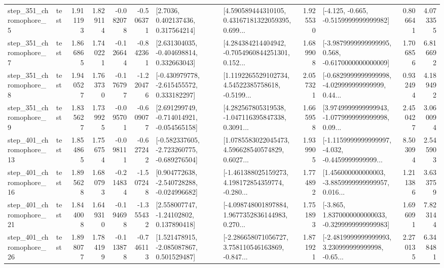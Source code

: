 \begin{tabular}{llrrrrllrlrr}
   step\_351\_chromophore\_5 &      test &      1.911193 &    1.829114 &     -0.082078 & -0.506371 &          [2.7036, 0.402137436, 0.317564214] &  [4.590589444310105, 0.43167181322059395, 0.699... &       1.925530 &              [-4.125, -0.665, -0.5159999999999982] &            0.806641 &          4.073355 \\
   step\_351\_chromophore\_7 &      test &      1.866865 &    1.740221 &     -0.126644 & -0.842361 &    [2.631304035, -0.404698814, 0.332663043] &  [4.284384214404942, -0.7054960844251301, 0.152... &       1.689908 &  [-3.9879999999999995, 0.568, -0.6170000000000009] &            1.706856 &          6.816692 \\
   step\_351\_chromophore\_8 &      test &      1.940527 &    1.763730 &     -0.176797 & -1.220476 &   [-0.430979778, -2.615455572, 0.333182297] &  [1.1192265529102734, 4.54522385758618, -0.5199... &       2.057321 &  [-0.6829999999999998, -4.029999999999999, 0.44... &            0.932494 &          4.189492 \\
   step\_351\_chromophore\_9 &      test &      1.835627 &    1.739925 &     -0.095701 & -0.609077 &   [2.691299749, -0.714014921, -0.054565158] &  [4.282567805319538, -1.047116395847338, 0.3091... &       1.665958 &  [3.9749999999999943, -1.0779999999999998, 0.09... &            2.450427 &          3.060094 \\
  step\_401\_chromophore\_13 &      test &      1.854865 &    1.756754 &     -0.098111 & -0.627242 &  [-0.582337605, -2.723260775, -0.689276504] &  [1.0785583022045473, 4.596628540574829, 0.6027... &       1.939905 &  [-1.1159999999999997, -4.032, -0.4459999999999... &            8.503094 &          2.545903 \\
  step\_401\_chromophore\_16 &      test &      1.895628 &    1.680793 &     -0.214834 & -1.507248 &   [0.904772638, -2.540728288, -0.024996682] &  [-1.461388025159273, 4.198172854359774, -0.280... &       1.774892 &  [1.456000000000003, -3.8859999999999957, 0.016... &            1.211386 &          3.633759 \\
  step\_401\_chromophore\_21 &      test &      1.844008 &    1.649310 &     -0.194698 & -1.355432 &     [2.558007747, -1.24102802, 0.137890418] &  [-4.098748001897884, 1.9677352836144983, 0.270... &       1.751893 &  [-3.865, 1.8370000000000033, -0.3299999999999983] &            1.696091 &          7.823144 \\
  step\_401\_chromophore\_26 &      test &      1.898077 &    1.784199 &     -0.113878 & -0.746113 &    [1.521478915, -2.085087867, 0.501529487] &  [-2.286658071056727, 3.758110546163869, -0.847... &       1.871921 &  [-2.4819999999999993, 3.230999999999998, -0.65... &            2.270135 &          6.348481 \\

\end{tabular}
